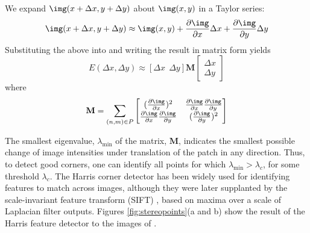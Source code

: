 We expand $\img (x + \Delta x, y + \Delta y)$ about $\img (x, y)$ in a Taylor series:
\begin{equation}
    \img (x + \Delta x, y + \Delta y) \approx
    \img (x, y) + \frac{\partial \img}{\partial x} \Delta x
    + \frac{\partial \img}{\partial y} \Delta y
\end{equation}
Substituting the above into \eqn{\ref{eq:harris}} and writing the result in matrix form yields
\begin{equation}
    E(\Delta x, \Delta y) \approx
    \left[
        \Delta x ~~ \Delta y
        \right]
    \mathbf{M}
    \left[ \begin{array}{c}
            \Delta x \\
            \Delta y
        \end{array}
        \right]
\end{equation}
where
\begin{equation}
    \mathbf{M} = \sum_{(n, m) \in P}
    \begin{bmatrix}
        (\frac{\partial \img}{\partial x})^2 &
        \frac{\partial \img}{\partial x}
        \frac{\partial \img}{\partial y}                                            \\
        \frac{\partial \img}{\partial x}
        \frac{\partial \img}{\partial y}
                                             & (\frac{\partial \img}{\partial y})^2
    \end{bmatrix}
\end{equation}

The smallest eigenvalue, $\lambda_{\mbox{min}}$ of the matrix, $\mathbf{M}$, indicates the smallest possible change of image intensities under translation of the patch in any direction.  Thus, to detect good corners, one can identify all points for which $\lambda_{\mbox{min}} > \lambda_c$, for some threshold $\lambda_c$.
The Harris corner detector has been widely used for identifying features to match across images, although they were later supplanted by the scale-invariant feature transform (SIFT) \cite{Lowe04},
based on maxima over a scale of Laplacian filter outputs.  Figures \ref{fig:stereopoints}(a and b) show the result of the Harris feature detector to the images of \fig{\ref{fig:stereomatch}}.


